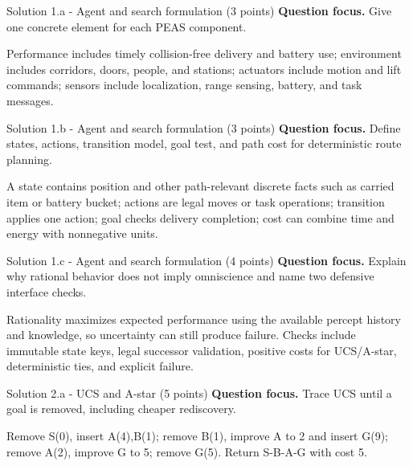 \documentclass[aspectratio=169,11pt]{beamer}
\begin{document}
\begin{frame}{Solution 1.a - Agent and search formulation (3 points)}
\small
\textbf{Question focus.} Give one concrete element for each PEAS component.

\vspace{0.25cm}
\answerlabel Performance includes timely collision-free delivery and battery use; environment includes corridors, doors, people, and stations; actuators include motion and lift commands; sensors include localization, range sensing, battery, and task messages.
\end{frame}

\begin{frame}{Solution 1.b - Agent and search formulation (3 points)}
\small
\textbf{Question focus.} Define states, actions, transition model, goal test, and path cost for deterministic route planning.

\vspace{0.25cm}
\answerlabel A state contains position and other path-relevant discrete facts such as carried item or battery bucket; actions are legal moves or task operations; transition applies one action; goal checks delivery completion; cost can combine time and energy with nonnegative units.
\end{frame}

\begin{frame}{Solution 1.c - Agent and search formulation (4 points)}
\small
\textbf{Question focus.} Explain why rational behavior does not imply omniscience and name two defensive interface checks.

\vspace{0.25cm}
\answerlabel Rationality maximizes expected performance using the available percept history and knowledge, so uncertainty can still produce failure. Checks include immutable state keys, legal successor validation, positive costs for UCS/A-star, deterministic ties, and explicit failure.
\end{frame}

\begin{frame}{Solution 2.a - UCS and A-star (5 points)}
\small
\textbf{Question focus.} Trace UCS until a goal is removed, including cheaper rediscovery.

\vspace{0.25cm}
\answerlabel Remove S(0), insert A(4),B(1); remove B(1), improve A to 2 and insert G(9); remove A(2), improve G to 5; remove G(5). Return S-B-A-G with cost 5.
\end{frame}
\end{document}
